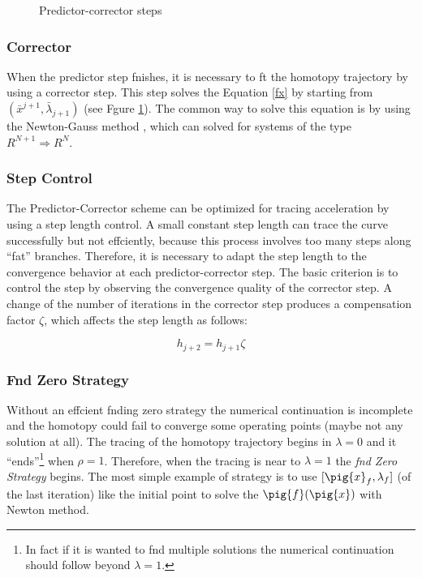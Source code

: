 \documentclass[conference]{IEEEtran}
\begin{document}
\begin{figure}[hbtp]
\centerline{
\epsfxsize=80mm
}
\caption{Predictor-corrector steps}
\label{pcorrector}
\end{figure}

 
\subsubsection{Corrector}

When the predictor step fnishes, it is necessary to ft the homotopy trajectory by
using a corrector step. This step  solves the Equation \ref{fx} by starting
from $(\bar{x}^{j+1},\bar{\lambda}_{j+1})$ (see Fgure \ref{pcorrector}). The common
way to solve this equation is by using the Newton-Gauss method \cite{homo_allgower}, which
can solved for systems of the type $R^{N+1} \Rightarrow R^N$.

\subsubsection{Step Control}

The Predictor-Corrector scheme can be optimized for tracing acceleration by
using a step length control. A small constant step length can trace the curve successfully
but not effciently, because this process involves too many steps along ``fat'' branches.
Therefore, it is necessary to adapt the step length to the convergence behavior at each
predictor-corrector step. The basic criterion is to control the step by observing the
convergence quality of the corrector step. A change of the number of iterations in the corrector step produces
a compensation factor $\zeta$, which affects the step length as follows:


\begin{displaymath}
h_{j+2}=h_{j+1} \zeta
\label{zero}
\end{displaymath}


\subsubsection{Fnd Zero Strategy}

Without an effcient fnding zero strategy
the numerical continuation is incomplete and the homotopy could fail to converge some operating
points (maybe not any solution at all).
The tracing of the homotopy trajectory begins in $\lambda=0$ and it ``ends''\footnote{In fact if it is wanted to fnd multiple solutions the numerical continuation should follow beyond $\lambda=1$.} when $\rho=1$. Therefore,
when the tracing is near to $\lambda=1$ the {\it fnd Zero Strategy} begins. The most simple example
of strategy is to use $[\pig{x}_f,\lambda_f]$ (of the last iteration) like the initial point
to solve the $\pig{f}(\pig{x})$ with Newton method. 
\end{document}
